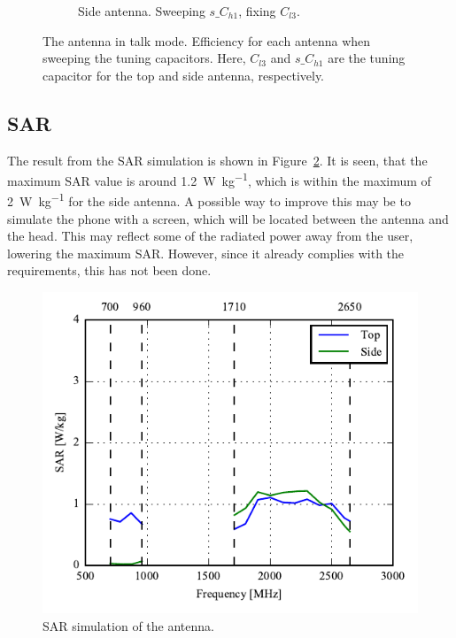 \begin{figure}[htbp]
\begin{subfigure}{0.49\linewidth}
        \caption{Side antenna. Sweeping $s\_C_{h1}$, fixing $C_{l3}$.}
    \end{subfigure}
    \caption{The antenna in talk mode. Efficiency for each antenna when sweeping the tuning capacitors. Here, $C_{l3}$ and $s\_C_{h1}$ are the tuning capacitor for the top and side antenna, respectively.}
    \label{fig:eff_sol3talk}
\end{figure}


\FloatBarrier
\subsection{SAR}
The result from the SAR simulation is shown in Figure~\ref{fig:ant3_sar_sim}. It is seen, that the maximum SAR value is around \SI{1.2}{W\per kg}, which is within the maximum of \SI{2}{W\per kg} for the side antenna. A possible way to improve this may be to simulate the phone with a screen, which will be located between the antenna and the head. This may reflect some of the radiated power away from the user, lowering the maximum SAR. However, since it already complies with the requirements, this has not been done. 

\begin{figure}[htbp]
    \centering
    \includegraphics{img/tech_sol/nonresonant/simulation/sar/Sar_top_side.pdf}
    \caption{SAR simulation of the antenna.}
    \label{fig:ant3_sar_sim}
\end{figure}
